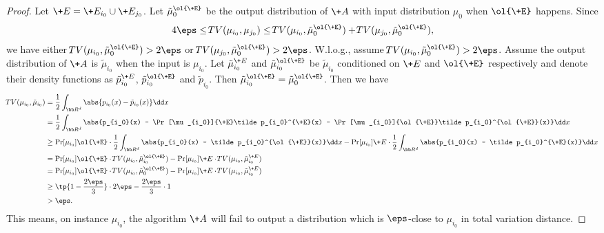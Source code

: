 \begin{proof}
    Let $\+E=\+E_{i_0}\cup \+E_{j_0}$. Let $\tilde \mu_0^{\ol{\+E}}$ be the output distribution of $\+A$ with input distribution $\mu_0$ when $\ol{\+E}$ happens. 
    Since
    \begin{align*}
        4\eps\leq \DTV(\mu_{i_0},\mu_{j_0}) \leq \DTV(\mu_{i_0},\tilde \mu_0^{\ol{\+E}}) + \DTV(\mu_{j_0},\tilde \mu_0^{\ol{\+E}}),
    \end{align*}
    we have either $\DTV(\mu_{i_0},\tilde \mu_0^{\ol{\+E}})>2\eps$ or $\DTV(\mu_{j_0},\tilde \mu_0^{\ol{\+E}})>2\eps$. W.l.o.g., assume $\DTV(\mu_{i_0},\tilde \mu_0^{\ol{\+E}})>2\eps$. Assume the output distribution of $\+A$ is $\tilde \mu_{i_0}$ when the input is $\mu_{i_0}$. Let $\tilde \mu_{i_0}^{\+E}$ and $\tilde \mu_{i_0}^{\ol{\+E}}$ be $\tilde \mu_{i_0}$ conditioned on $\+E$ and $\ol{\+E}$ respectively and denote their density functions as $\tilde p_{i_0}^{\+E}$, $\tilde p_{i_0}^{\ol{\+E}}$ and $\tilde p_{i_0}$. Then $\tilde \mu_{i_0}^{\ol{\+E}}=\tilde \mu_0^{\ol{\+E}}$. 
    Then we have
    \begin{align*}
        \DTV(\mu_{i_0},\tilde \mu_{i_0}) &= \frac{1}{2}\int_{\bb R^d} \abs{p_{i_0}(x) - \tilde p_{i_0} (x)} \dd x\\
        &=\frac{1}{2}\int_{\bb R^d} \abs{p_{i_0}(x) - \Pr[\mu_{i_0}]{\+E}\tilde p_{i_0}^{\+E}(x) - \Pr[\mu_{i_0}]{\ol{\+E}}\tilde p_{i_0}^{\ol{\+E}}(x)} \dd x \\
        &\geq \Pr[\mu_{i_0}]{\ol{\+E}}\cdot \frac{1}{2} \int_{\bb R^d}\abs{p_{i_0}(x) - \tilde p_{i_0}^{\ol{\+E}}(x)} \dd x  - \Pr[\mu_{i_0}]{\+E}\cdot \frac{1}{2} \int_{\bb R^d}\abs{p_{i_0}(x) - \tilde p_{i_0}^{\+E}(x)} \dd x \\
        & = \Pr[\mu_{i_0}]{\ol{\+E}}\cdot \DTV(\mu_{i_0}, \tilde \mu_{i_0}^{\ol{\+E}}) - \Pr[\mu_{i_0}]{\+E}\cdot \DTV(\mu_{i_0}, \tilde \mu_{i_0}^{\+E}) \\
        & = \Pr[\mu_{i_0}]{\ol{\+E}}\cdot \DTV(\mu_{i_0}, \tilde \mu^{\ol{\+E}}_0) - \Pr[\mu_{i_0}]{\+E}\cdot \DTV(\mu_{i_0}, \tilde \mu_{i_0}^{\+E}) \\
        &\geq \tp{1-\frac{2\eps}{3}}\cdot 2\eps - \frac{2\eps}{3}\cdot 1\\
        &>\eps.
    \end{align*}
    This means, on instance $\mu_{i_0}$, the algorithm $\+A$ will fail to output a distribution which is $\eps$-close to $\mu_{i_0}$ in total variation distance.
\end{proof}


